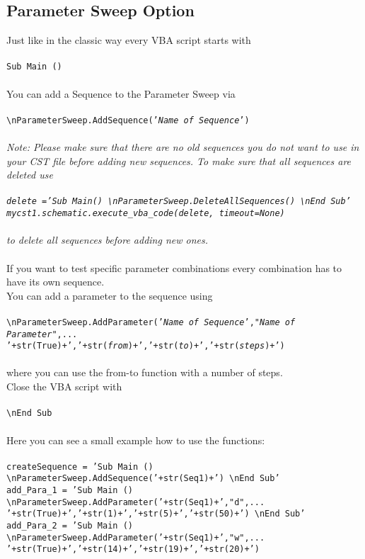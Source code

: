\documentclass[12pt,accentcolor=tud2b, colorback, openany]{tudreport}
\begin{document}
	\subsection{Parameter Sweep Option}
	Just like in the classic way every VBA script starts with\\
	\\
	\texttt{Sub Main ()}\\
	\\
	You can add a Sequence to the Parameter Sweep via\\
	\\
	\texttt{\textbackslash nParameterSweep.AddSequence('\textit{Name of Sequence}')}\\
	\\
	\textit{Note: Please make sure that there are no old sequences you do not want to use in your CST file before adding new sequences. To make sure that all sequences are deleted use\\
	\\
	\texttt{delete ='Sub Main() \textbackslash nParameterSweep.DeleteAllSequences() \textbackslash nEnd Sub'\\
	mycst1.schematic.execute\_vba\_code(delete, timeout=None)}\\
	\\
	to delete all sequences before adding new ones.}\\
	\\
	If you want to test specific parameter combinations every combination has to have its own sequence.\\
	You can add a parameter to the sequence using\\
	\\
	\texttt{\textbackslash nParameterSweep.AddParameter('\textit{Name of Sequence}',"\textit{Name of Parameter}",...\\
	'+str(True)+','+str(\textit{from})+','+str(\textit{to})+','+str(\textit{steps})+')}\\
	\\
	where you can use the from-to function with a number of steps.\\
	Close the VBA script with\\
	\\
	\texttt{\textbackslash nEnd Sub}\\
	\\
	Here you can see a small example how to use the functions:\\
	\\
	\texttt{createSequence = 'Sub Main () \textbackslash nParameterSweep.AddSequence('+str(Seq1)+') \textbackslash nEnd Sub'\\
	add\_Para\_1 = 'Sub Main () \textbackslash nParameterSweep.AddParameter('+str(Seq1)+',"d",...\\
	'+str(True)+','+str(1)+','+str(5)+','+str(50)+') \textbackslash nEnd Sub'\\
	add\_Para\_2 = 'Sub Main () \textbackslash nParameterSweep.AddParameter('+str(Seq1)+',"w",...\\
	'+str(True)+','+str(14)+','+str(19)+','+str(20)+')}\\
\end{document}
